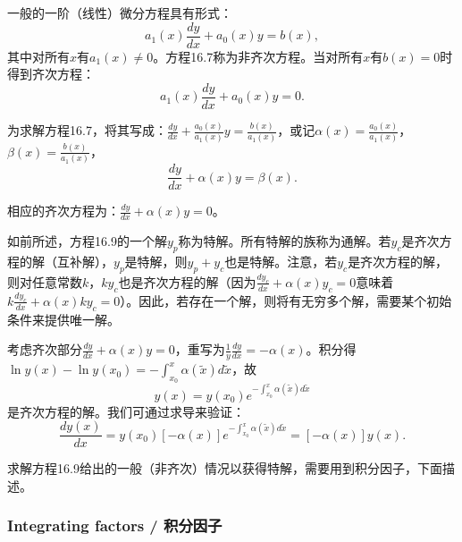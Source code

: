 \begin{translation}
一般的一阶（线性）微分方程具有形式：
\[
a_1(x)\frac{dy}{dx} + a_0(x)y = b(x), \tag{16.7}
\]
其中对所有$x$有$a_1(x) \neq 0$。方程16.7称为非齐次方程。当对所有$x$有$b(x) = 0$时得到齐次方程：
\[
a_1(x)\frac{dy}{dx} + a_0(x)y = 0. \tag{16.8}
\]

为求解方程16.7，将其写成：$\frac{dy}{dx} + \frac{a_0(x)}{a_1(x)}y = \frac{b(x)}{a_1(x)}$，或记$\alpha(x) = \frac{a_0(x)}{a_1(x)}$，$\beta(x) = \frac{b(x)}{a_1(x)}$，
\[
\frac{dy}{dx} + \alpha(x)y = \beta(x). \tag{16.9}
\]

相应的齐次方程为：$\frac{dy}{dx} + \alpha(x)y = 0$。

如前所述，方程16.9的一个解$y_p$称为特解。所有特解的族称为通解。若$y_c$是齐次方程的解（互补解），$y_p$是特解，则$y_p + y_c$也是特解。注意，若$y_c$是齐次方程的解，则对任意常数$k$，$k y_c$也是齐次方程的解（因为$\frac{dy_c}{dx} + \alpha(x) y_c = 0$意味着$k\frac{dy_c}{dx} + \alpha(x)k y_c = 0$）。因此，若存在一个解，则将有无穷多个解，需要某个初始条件来提供唯一解。

考虑齐次部分$\frac{dy}{dx} + \alpha(x)y = 0$，重写为$\frac{1}{y}\frac{dy}{dx} = -\alpha(x)$。积分得$\ln y(x) - \ln y(x_0) = -\int_{x_0}^{x} \alpha(\tilde{x}) d\tilde{x}$，故
\[
y(x) = y(x_0)e^{-\int_{x_0}^{x} \alpha(\tilde{x}) d\tilde{x}} \tag{16.10}
\]
是齐次方程的解。我们可通过求导来验证：
\[
\frac{d y(x)}{dx} = y(x_0)[-\alpha(x)]e^{-\int_{x_0}^{x} \alpha(\tilde{x}) d\tilde{x}} = [-\alpha(x)]y(x).
\]

求解方程16.9给出的一般（非齐次）情况以获得特解，需要用到积分因子，下面描述。
\end{translation}

\subsubsection{Integrating factors / 积分因子}

